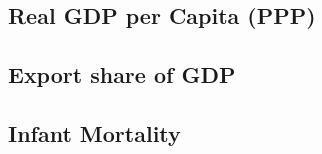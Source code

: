 \documentclass[12pt]{article}
\begin{document}
\subsection{Real GDP per Capita (PPP)}

\subsection{Export share of GDP}

\subsection{Infant Mortality}





\newpage
\singlespacing
\printbibliography

\end{document}
